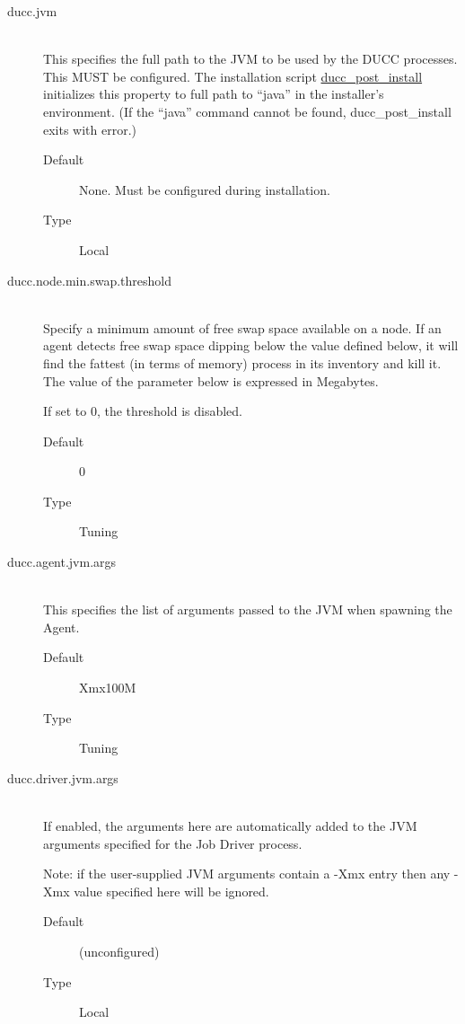 \begin{description}
       \item[ducc.jvm] \hfill \\
         This specifies the full path to the JVM to be used by the DUCC processes. This MUST be
         configured.  The installation script
         \hyperref[subsec:install.single-user]{ducc\_post\_install} initializes this property to 
         full path to ``java'' in the installer's environment.  (If the ``java'' command cannot
         be found, ducc\_post\_install exits with error.)
         \begin{description}
           \item[Default] None.  Must be configured during installation.
           \item[Type] Local 
         \end{description}

       \item[ducc.node.min.swap.threshold] \hfill \\
         Specify a minimum amount of free swap space available on a node.
         If an agent detects free swap space dipping below the value defined
         below, it will find the fattest (in terms of memory) process in its
         inventory and kill it. The value of the parameter below is expressed
         in Megabytes.

         If set to 0, the threshold is disabled.
         \begin{description}
           \item[Default] 0
           \item[Type] Tuning
         \end{description}


       \item[ducc.agent.jvm.args] \hfill \\
         This specifies the list of arguments passed to the JVM when spawning the Agent. 
         \begin{description}           
           \item[Default] Xmx100M 
           \item[Type] Tuning 
         \end{description}


       \item[ducc.driver.jvm.args] \hfill \\
         If enabled, the arguments here are automatically added to the JVM arguments specified for 
         the Job Driver process. 

         Note: if the user-supplied JVM arguments contain a -Xmx entry then 
         any -Xmx value specified here will be ignored.
         \begin{description}
           \item[Default] (unconfigured) 
           \item[Type] Local 
         \end{description}


\end{description}
